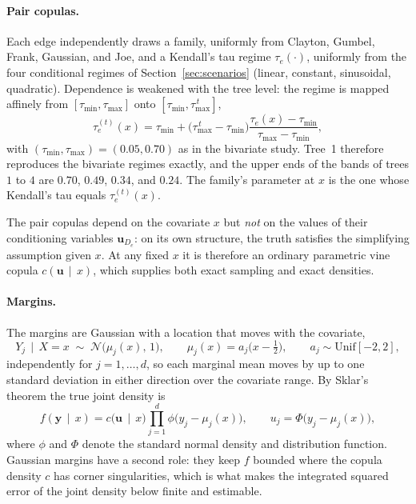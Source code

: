 \documentclass[11pt]{article}
\newcommand{\given}{\,\mid\,}
\begin{document}
\paragraph{Pair copulas.} Each edge independently draws a family,
uniformly from Clayton, Gumbel, Frank, Gaussian, and Joe, and a Kendall's
tau regime $\tau_e(\cdot)$, uniformly from the four conditional regimes
of Section~\ref{sec:scenarios} (linear, constant, sinusoidal,
quadratic). Dependence is weakened with the tree level: the regime is
mapped affinely from $[\tau_{\min},\tau_{\max}]$ onto
$[\tau_{\min},\tau_{\max}^{\,t}]$,
\begin{equation}
  \tau_{e}^{(t)}(x)
  =
  \tau_{\min}
  +
  \bigl(\tau_{\max}^{\,t}-\tau_{\min}\bigr)
  \frac{\tau_e(x)-\tau_{\min}}{\tau_{\max}-\tau_{\min}},
  \label{eq:tau-decay}
\end{equation}
with $(\tau_{\min},\tau_{\max}) = (0.05,0.70)$ as in the bivariate study.
Tree~1 therefore reproduces the bivariate regimes exactly, and the upper
ends of the bands of trees $1$ to $4$ are $0.70$, $0.49$, $0.34$, and
$0.24$. The family's parameter at $x$ is the one whose Kendall's tau equals
$\tau_e^{(t)}(x)$.

The pair copulas depend on the covariate $x$ but \emph{not} on the values
of their conditioning variables $\mathbf u_{D_e}$: on its own structure,
the truth satisfies the simplifying assumption given $x$. At any fixed $x$
it is therefore an ordinary parametric vine copula $c(\mathbf u \given x)$,
which supplies both exact sampling and exact densities.

\paragraph{Margins.} The margins are Gaussian with a location that moves
with the covariate,
\begin{equation}
  Y_j \given X = x \;\sim\; \mathcal N\bigl(\mu_j(x),\,1\bigr),
  \qquad
  \mu_j(x) = a_j\bigl(x-\tfrac12\bigr),
  \qquad
  a_j \sim \mathrm{Unif}[-2,2],
  \label{eq:vine-margins}
\end{equation}
independently for $j=1,\ldots,d$, so each marginal mean moves by up to one
standard deviation in either direction over the covariate range. By
Sklar's theorem the true joint density is
\begin{equation}
  f(\mathbf y \given x)
  =
  c\bigl(\mathbf u \given x\bigr)
  \prod_{j=1}^d \phi\bigl(y_j-\mu_j(x)\bigr),
  \qquad
  u_j = \Phi\bigl(y_j-\mu_j(x)\bigr),
  \label{eq:vine-joint}
\end{equation}
where $\phi$ and $\Phi$ denote the standard normal density and
distribution function. Gaussian margins have a second role: they keep $f$
bounded where the copula density $c$ has corner singularities, which is
what makes the integrated squared error of the joint density below finite
and estimable.
\end{document}
